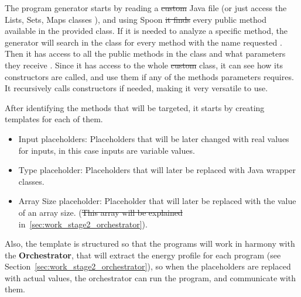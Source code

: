 
The program generator starts by reading a \st{custom} Java file (or just access the Lists, Sets, Maps classes ), and using Spoon \st{it finds}  every public method available in the provided class. If it is needed to analyze a specific method, the generator will search in the class for every method with the name requested . Then it has access to all the public methods in the class and what parameters they receive .
Since it has access to the whole \st{custom} class, it can see how its constructors are called, and use them if any of the methods parameters requires. It recursively calls constructors if needed, making it very versatile to use. 

After identifying the methods that will be targeted, it starts by creating templates for each of them. 


\begin{itemize}

\item Input placeholders: Placeholders that will be later changed with real values for inputs, in this case inputs are variable values. 

\item Type placeholder: Placeholders that will later be replaced with Java wrapper classes.
  
\item Array Size placeholder: Placeholder that will later be replaced with the value of an array size. (\st{This array will be explained}  in~\ref{sec:work_stage2_orchestrator}). 

\end{itemize}

Also, the template is structured so that the programs will work in harmony with the \textbf{Orchestrator}, that will extract the energy profile for each program (see Section~\ref{sec:work_stage2_orchestrator}), so when the placeholders are replaced with actual values, the orchestrator can run the program, and communicate with them.


